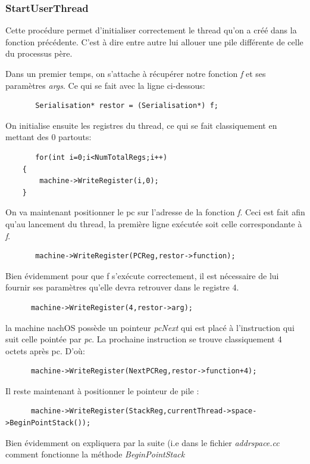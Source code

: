 \documentclass[a4paper,10pt]{article}
\begin{document}
    \subsubsection*{StartUserThread}
      Cette procédure permet d'initialiser correctement le thread qu'on a créé dans la fonction précédente. C'est à dire entre autre lui allouer une pile différente de
      celle du processus père.
      
      Dans un premier temps, on s'attache à récupérer notre fonction \emph{f} et ses paramètres \emph{args}. Ce qui se fait avec la ligne ci-dessous:
      \begin{lstlisting}
       Serialisation* restor = (Serialisation*) f;
      \end{lstlisting}
      
      On initialise ensuite les registres du thread, ce qui se fait classiquement en mettant des 0 partouts:
      \begin{lstlisting}
       for(int i=0;i<NumTotalRegs;i++)
	{
		machine->WriteRegister(i,0);
	}
      \end{lstlisting}
      
      On va maintenant positionner le pc sur l'adresse de la fonction \emph{f}. Ceci est fait afin qu'au lancement du thread, la première ligne exécutée 
      soit celle correspondante à \emph{f}.
      \begin{lstlisting}
       machine->WriteRegister(PCReg,restor->function);
      \end{lstlisting}
      Bien évidemment pour que f s'exécute correctement, il est nécessaire de lui fournir ses paramètres qu'elle devra retrouver dans le registre 4.
      \begin{lstlisting}
      machine->WriteRegister(4,restor->arg);
      \end{lstlisting}
      
      la machine nachOS possède un pointeur \emph{pcNext} qui est placé à l'instruction qui suit celle pointée par \emph{pc}. La prochaine instruction 
      se trouve classiquement 4 octets après pc. D'où:
      \begin{lstlisting}
      machine->WriteRegister(NextPCReg,restor->function+4);
      \end{lstlisting}
      
      Il reste maintenant à positionner le pointeur de pile : 
      \begin{lstlisting}
      machine->WriteRegister(StackReg,currentThread->space->BeginPointStack());
      \end{lstlisting}
      Bien évidemment on expliquera par la suite (i.e dans le fichier \emph{addrspace.cc} comment fonctionne la méthode \emph{BeginPointStack}
      
\end{document}
